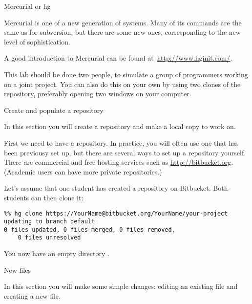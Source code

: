  {Mercurial or hg}

Mercurial is one of a new generation of  systems. Many of its commands are the same as for subversion,
but there are some new ones, corresponding to the new level of 
sophistication.

A good introduction to Mercurial can be found
at~\url{http://www.hginit.com/}.

This lab should be done two people, to simulate a group
of programmers working on a joint project. You can also do this on
your own by using two clones of the repository, 
preferably opening two windows on your computer.

 {Create and populate a repository}

\begin{purpose}
  In this section you will create a repository and make a local copy
  to work on.
\end{purpose}

First we need to have a repository. In practice, you will often use
one that has been previousy set up, but there are several ways to
set up a repository yourself.
There are commercial and free hosting services such as
  \url{http://bitbucket.org}. (Academic users can have more private
  repositories.)

Let's assume that one student has created a repository 
on Bitbucket. Both students can then clone it:
\begin{verbatim}
%% hg clone https://YourName@bitbucket.org/YourName/your-project
updating to branch default
0 files updated, 0 files merged, 0 files removed, 
    0 files unresolved
\end{verbatim}
You now have an empty directory .


 {New files}
\label{sec:hg-push}

\begin{purpose}
  In this section you will make some simple changes: editing an
  existing file and creating a new file.
\end{purpose}

